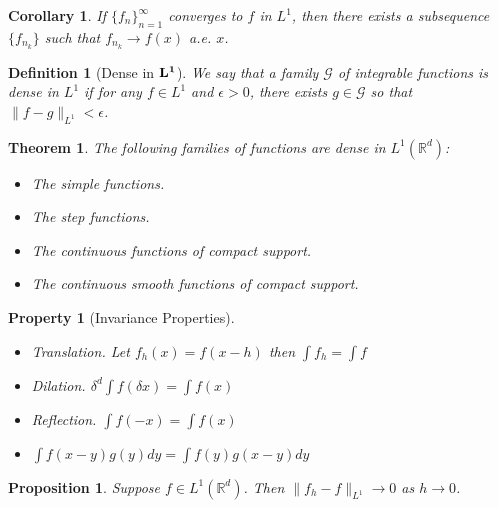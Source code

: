 \documentclass{report}
\theoremstyle{upthm}
\newtheorem{thm}{Theorem}
\newtheorem{defn}{Definition}
\newtheorem{cor}{Corollary}
\newtheorem{prop}{Proposition}
\newtheorem{property}{Property}
\newcommand{\reals}{\mathbb{R}}
\newcommand{\calG}{{\mathcal{G}}}
\newcommand{\set}[1]{\big\lbrace #1 \big\rbrace}
\begin{document}
\begin{cor}
	If $\set{f_n}_{n=1}^{\infty}$ converges to $f$ in $L^1$, then there exists a subsequence $\set{f_{n_k}}$ such that $f_{n_k} \rightarrow f(x)$ a.e. $x$.
\end{cor}

\begin{defn}[Dense in $\bf L^1$]
	We say that a family $\calG$ of integrable functions is dense in $L^1$ if for any
	$f \in L^1$ and $\epsilon > 0$, there exists $g \in \calG$ so that $\|f - g\|_{L^1} <\epsilon $.
\end{defn}

\begin{thm}
	The following families of functions are dense in $L^1(\reals^d)$:
	\begin{itemize}
		\item The simple functions.
		\item The step functions.
		\item  The continuous functions of compact support.
		\item  The continuous smooth functions of compact support.
	\end{itemize}
\end{thm}

\begin{property}[Invariance Properties]\item
	\begin{itemize}
		\item Translation. Let $f_h(x) = f(x - h)$ then $\int f_h = \int f$
		\item Dilation. $\delta^d \int f(\delta x) = \int f(x)$
		\item Reflection. $\int f(-x) = \int f(x)$
		\item $\int f(x-y) g(y) dy= \int f(y) g(x-y) dy$
	\end{itemize}
\end{property}

\begin{prop}
	Suppose $f \in L^1(\reals^d)$. Then $ \| f_h - f \|_{L^1} \rightarrow 0 $ as $h \rightarrow 0$.
\end{prop}
\end{document}
